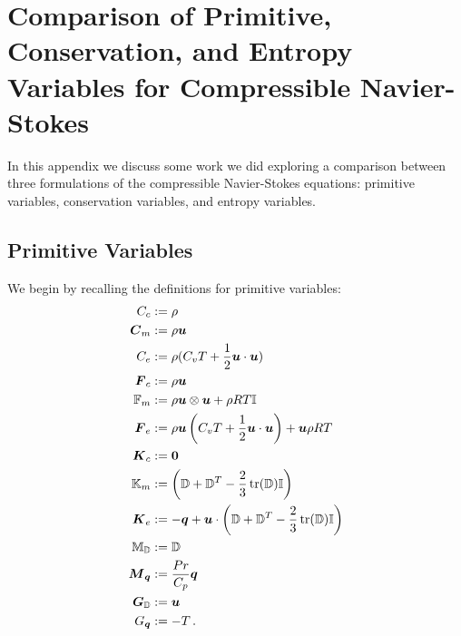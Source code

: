 \documentclass[Dissertation.tex]{subfiles}
\begin{document}
\graphicspath{{../Figures/}}
\chapter{Comparison of Primitive, Conservation, and Entropy Variables for Compressible Navier-Stokes}
\label{sec:VariableComparison}
In this appendix we discuss some work we did exploring a comparison between three formulations of the 
compressible Navier-Stokes equations: primitive variables, conservation variables, and entropy variables.

\section{Primitive Variables}
We begin by recalling the definitions for primitive variables:
\begin{align*}
C_c&:=\rho\\
\boldsymbol C_m&:=\rho\boldsymbol u\\
C_e&:=\rho(C_v T+\frac{1}{2}\boldsymbol u\cdot\boldsymbol u)\\
\boldsymbol F_c&:=\rho\boldsymbol u\\
\mathbb{F}_m&:=\rho\boldsymbol u\otimes\boldsymbol u+\rho RT\mathbb{I}\\
\boldsymbol F_e&:=\rho\boldsymbol u\left( C_v T+\frac{1}{2}\boldsymbol u\cdot\boldsymbol u \right)+\boldsymbol u\rho RT\\
\boldsymbol K_c&:=\boldsymbol 0\\
\mathbb{K}_m&:=\left( \mathbb{D}+\mathbb{D}^T-\frac{2}{3}\operatorname*{tr}(\mathbb{D})\mathbb{I} \right)\\
\boldsymbol K_e&:=-\boldsymbol q+\boldsymbol u\cdot\left( \mathbb{D}+\mathbb{D}^T-\frac{2}{3}\operatorname*{tr}(\mathbb{D})\mathbb{I} \right)\\
\mathbb{M}_{\mathbb{D}}&:=\mathbb{D}\\
\boldsymbol M_{\boldsymbol q}&:=\frac{Pr}{C_p}\boldsymbol q\\
\boldsymbol G_{\mathbb{D}}&:=\boldsymbol u\\
G_{\boldsymbol q}&:=-T\,.
\end{align*}
\end{document}

